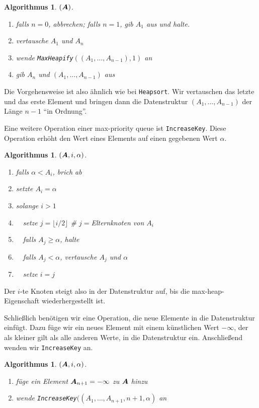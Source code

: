 \documentclass[10pt,reqno]{amsart}
\numberwithin{equation}{section}
\newcommand\vA{\vec A}
\def\vec#1{\mathchoice{\mbox{\boldmath$\displaystyle#1$}}
{\mbox{\boldmath$\textstyle#1$}}
{\mbox{\boldmath$\scriptstyle#1$}}
{\mbox{\boldmath$\scriptscriptstyle#1$}}}
\newtheorem{algorithm}[definition]{Algorithmus}
\begin{document}
\begin{algorithm}$(\vA)$.\label{alg_extractmax}
	\begin{enumerate}
		\item falls $n=0$, abbrechen; falls $n=1$, gib $A_1$ aus und halte.
		\item vertausche $A_1$ und $A_n$
		\item wende {\tt MaxHeapify}$((A_1,\ldots,A_{n-1}),1)$ an
		\item gib $A_n$ und $(A_1,\ldots,A_{n-1})$ aus
	\end{enumerate}
\end{algorithm}

Die Vorgehensweise ist also \"ahnlich wie bei {\tt Heapsort}.
Wir vertauschen das letzte und das erste Element und bringen dann die Datenstruktur $(A_1,\ldots,A_{n-1})$ der L\"ange $n-1$ ``in Ordnung''.

Eine weitere Operation einer max-priority queue ist {\tt IncreaseKey}.
Diese Operation erh\"oht den Wert eines Elements auf einen gegebenen Wert $\alpha$.

\begin{algorithm}$(\vA,i,\alpha)$.\label{alg_increasekey}
	\begin{enumerate}
		\item falls $\alpha<A_i$, brich ab
		\item setzte $A_i=\alpha$
		\item solange $i>1$
		\item $\quad$setze $j=\lfloor i/2\rfloor$ \hfill\# $j=$Elternknoten von $A_i$
		\item $\quad$falls $A_j\geq\alpha$, halte
		\item $\quad$falls $A_j<\alpha$, vertausche $A_j$ und $\alpha$
		\item $\quad$setze $i=j$
	\end{enumerate}
\end{algorithm}

Der $i$-te Knoten steigt also in der Datenstruktur auf, bis die max-heap-Eigenschaft wiederhergestellt ist.

Schlie\ss lich ben\"otigen wir eine Operation, die neue Elemente in die Datenstruktur einf\"ugt.
Dazu f\"uge wir ein neues Element mit einem k\"unstlichen Wert $-\infty$, der als kleiner gilt als alle anderen Werte, in die Datenstruktur ein.
Anschlie\ss end wenden wir {\tt IncreaseKey} an.

\begin{algorithm}$(\vA,i,\alpha)$.\label{alg_insert}
	\begin{enumerate}
		\item f\"uge ein Element $\vA_{n+1}=-\infty$ zu $\vA$ hinzu
		\item wende {\tt IncreaseKey}$((A_1,\ldots,A_{n+1},n+1,\alpha)$ an
	\end{enumerate}
\end{algorithm}
\end{document}
